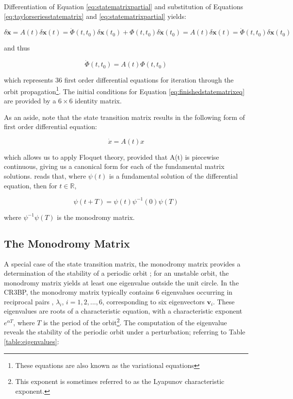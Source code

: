 \noindent Differentiation of Equation \ref{eq:statematrixpartial} and substitution of Equations \ref{eq:taylorseriesstatematrix} and \ref{eq:statematrixpartial} yields:

\begin{equation}
\delta \pmb{\dot{x}} = A \left( t \right) \delta \pmb{x} \left( t \right) = \dot{\Phi}\left(t, t_0\right) \delta \pmb{x} \left( t_0 \right) + \Phi \left(t, t_0\right) \delta\pmb{\dot{x}}\left(t_0\right) = A \left( t \right) \delta \pmb{x} \left( t \right) = \dot{\Phi}\left(t, t_0\right) \delta \pmb{x} \left( t_0 \right)
\end{equation}

\noindent and thus

\begin{equation}\label{eq:finishedstatematrixeq}
\dot{\Phi} \left( t, t_0 \right) = A\left( t\right)\Phi(t, t_0)
\end{equation}

\noindent which represents 36 first order differential equations for iteration through the orbit propagation\footnote{These equations are also known as the variational equations}. The initial conditions for Equation \ref{eq:finishedstatematrixeq} are provided by a $6\times 6$ identity matrix.

As an aside, note that the state transition matrix results in the following form of first order differential equation:

\begin{equation}
\dot{x} = A(t) x
\end{equation}

which allows us to apply Floquet theory, provided that A(t) is piecewise continuous, giving us a canonical form for each of the fundamental matrix solutions. \citep{Floquet1883} reads that, where $\psi (t)$ is a fundamental solution of the differential equation, then for $t \in \mathbb{R}$,

\begin{equation}
\psi(t+T) = \psi(t)\psi^{-1}(0)\psi(T)
\end{equation}

where $\psi^{-1}\psi(T)$ is the monodromy matrix.

\subsection{The Monodromy Matrix}

A special case of the state transition matrix, the monodromy matrix provides a determination of the stability of a periodic orbit \citep{Russell2006}; for an unstable orbit, the monodromy matrix yields at least one eigenvalue outside the unit circle. In the CR3BP, the monodromy matrix typically contains 6 eigenvalues occurring in reciprocal pairs \citep{broucke1968}, $\lambda_i$, $i = 1, 2, ..., 6$, corresponding to six eigenvectors $\pmb{v}_i$. These eigenvalues are roots of a characteristic equation, with a characteristic exponent $e^{\alpha T}$, where $T$ is the period of the orbit\footnote{This exponent is sometimes referred to as the Lyapunov characteristic exponent.}. The computation of the eigenvalue reveals the stability of the periodic orbit under a perturbation; referring to Table \ref{table:eigenvalues}:

